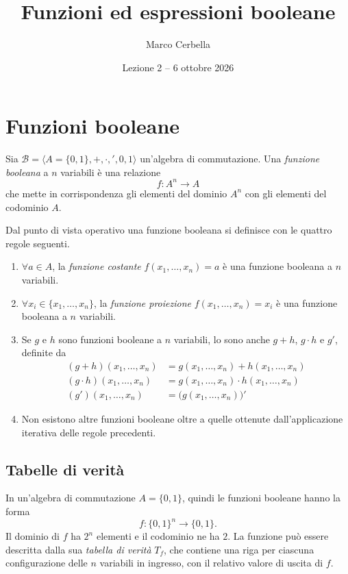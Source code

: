 \documentclass[11pt,a4paper]{article}
\title{Funzioni ed espressioni booleane}
\author{Marco Cerbella}
\date{Lezione 2 -- 6 ottobre 2026}
\begin{document}
\maketitle

\section{Funzioni booleane}

\begin{definizione}
Sia $\mathcal{B} = \langle A = \{0,1\}, +, \cdot, ', 0, 1 \rangle$ un'algebra di
commutazione. Una \emph{funzione booleana} a $n$ variabili è una relazione
\[
  f \colon A^n \to A
\]
che mette in corrispondenza gli elementi del dominio $A^n$ con gli elementi del
codominio $A$.
\end{definizione}

Dal punto di vista operativo una funzione booleana si definisce con le quattro
regole seguenti.
\begin{enumerate}
    \item $\forall a \in A$, la \emph{funzione costante}
          $f(x_1, \dots, x_n) = a$ è una funzione booleana a $n$ variabili.
    \item $\forall x_i \in \{x_1, \dots, x_n\}$, la \emph{funzione proiezione}
          $f(x_1, \dots, x_n) = x_i$ è una funzione booleana a $n$ variabili.
    \item Se $g$ e $h$ sono funzioni booleane a $n$ variabili, lo sono anche
          $g + h$, $g \cdot h$ e $g'$, definite da
          \begin{align*}
            (g + h)(x_1, \dots, x_n) &= g(x_1, \dots, x_n) + h(x_1, \dots, x_n)\\
            (g \cdot h)(x_1, \dots, x_n) &= g(x_1, \dots, x_n) \cdot h(x_1, \dots, x_n)\\
            (g')(x_1, \dots, x_n) &= \bigl(g(x_1, \dots, x_n)\bigr)'
          \end{align*}
    \item Non esistono altre funzioni booleane oltre a quelle ottenute
          dall'applicazione iterativa delle regole precedenti.
\end{enumerate}

\subsection{Tabelle di verità}

In un'algebra di commutazione $A = \{0,1\}$, quindi le funzioni booleane hanno
la forma
\[
  f \colon \{0,1\}^n \to \{0,1\}.
\]
Il dominio di $f$ ha $2^n$ elementi e il codominio ne ha $2$. La funzione può
essere descritta dalla sua \emph{tabella di verità} $T_f$, che contiene una riga
per ciascuna configurazione delle $n$ variabili in ingresso, con il relativo
valore di uscita di $f$.
\end{document}
